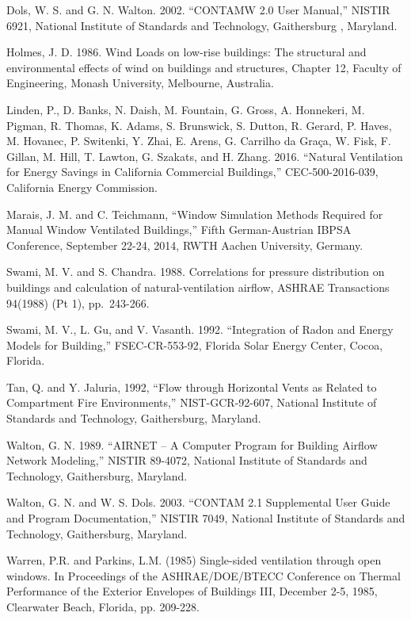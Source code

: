 Dols, W. S. and G. N. Walton. 2002. ``CONTAMW 2.0 User Manual,'' NISTIR 6921, National Institute of Standards and Technology, Gaithersburg , Maryland.

Holmes, J. D. 1986. Wind Loads on low-rise buildings: The structural and environmental effects of wind on buildings and structures, Chapter 12, Faculty of Engineering, Monash University, Melbourne, Australia.

Linden, P., D. Banks, N. Daish, M. Fountain, G. Gross, A. Honnekeri, M. Pigman, R. Thomas, K. Adams, 
S. Brunswick, S. Dutton, R. Gerard, P. Haves, M. Hovanec, P. Switenki, Y. Zhai, E. Arens, G. Carrilho da Gra\c{c}a, W. Fisk, F. Gillan, M. Hill, T. Lawton, G. Szakats, and H. Zhang. 2016. ``Natural Ventilation for Energy Savings in California Commercial Buildings,'' CEC-500-2016-039, California Energy Commission.

Marais, J. M. and C. Teichmann, ``Window Simulation Methods Required for Manual Window Ventilated Buildings,'' Fifth German-Austrian IBPSA Conference, September 22-24, 2014, RWTH Aachen University, Germany.

Swami, M. V. and S. Chandra. 1988. Correlations for pressure distribution on buildings and calculation of natural-ventilation airflow, ASHRAE Transactions 94(1988) (Pt 1), pp.~243-266.

Swami, M. V., L. Gu, and V. Vasanth. 1992. ``Integration of Radon and Energy Models for Building,'' FSEC-CR-553-92, Florida Solar Energy Center, Cocoa, Florida.

Tan, Q. and Y. Jaluria, 1992, ``Flow through Horizontal Vents as Related to Compartment Fire Environments,'' NIST-GCR-92-607, National Institute of Standards and Technology, Gaithersburg, Maryland.

Walton, G. N. 1989. ``AIRNET -- A Computer Program for Building Airflow Network Modeling,'' NISTIR 89-4072, National Institute of Standards and Technology, Gaithersburg, Maryland.

Walton, G. N. and W. S. Dols. 2003. ``CONTAM 2.1 Supplemental User Guide and Program Documentation,'' NISTIR 7049, National Institute of Standards and Technology, Gaithersburg, Maryland.

Warren, P.R. and Parkins, L.M. (1985) Single-sided ventilation through open windows. In Proceedings of the ASHRAE/DOE/BTECC Conference on Thermal Performance of the Exterior Envelopes of Buildings III, December 2-5, 1985, Clearwater Beach, Florida, pp. 209-228.
